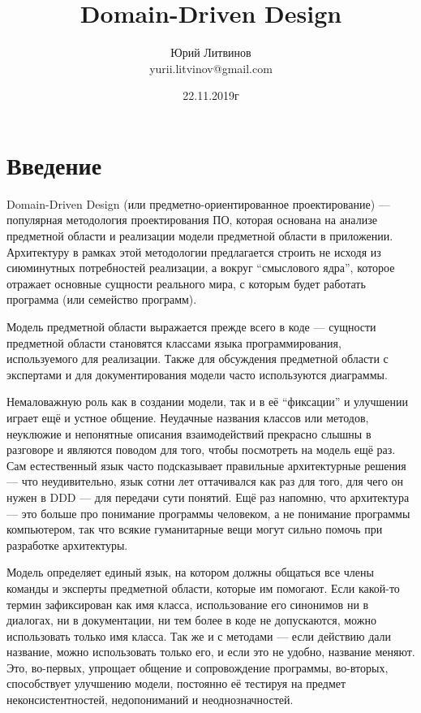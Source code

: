 \documentclass[a5paper]{article}
\title{Domain-Driven Design}
\author{Юрий Литвинов\\\small{yurii.litvinov@gmail.com}}
\date{22.11.2019г}
\begin{document}
\maketitle
\thispagestyle{empty}

\section{Введение}

 Domain-Driven Design (или предметно-ориентированное проектирование) --- популярная методология проектирования ПО, которая основана на анализе предметной области и реализации модели предметной области в приложении. Архитектуру в рамках этой методологии предлагается строить не исходя из сиюминутных потребностей реализации, а вокруг ``смыслового ядра'', которое отражает основные сущности реального мира, с которым будет работать программа (или семейство программ).

Модель предметной области выражается прежде всего в коде --- сущности предметной области становятся классами языка программирования, используемого для реализации. Также для обсуждения предметной области с экспертами и для документирования модели часто используются диаграммы.

Немаловажную роль как в создании модели, так и в её ``фиксации'' и улучшении играет ещё и устное общение. Неудачные названия классов или методов, неуклюжие и непонятные описания взаимодействий прекрасно слышны в разговоре и являются поводом для того, чтобы посмотреть на модель ещё раз. Сам естественный язык часто подсказывает правильные архитектурные решения --- что неудивительно, язык сотни лет оттачивался как раз для того, для чего он нужен в DDD --- для передачи сути понятий. Ещё раз напомню, что архитектура --- это больше про понимание программы человеком, а не понимание программы компьютером, так что всякие гуманитарные вещи могут сильно помочь при разработке архитектуры.

Модель определяет единый язык, на котором должны общаться все члены команды и эксперты предметной области, которые им помогают. Если какой-то термин зафиксирован как имя класса, использование его синонимов ни в диалогах, ни в документации, ни тем более в коде не допускаются, можно использовать только имя класса. Так же и с методами --- если действию дали название, можно использовать только его, и если это не удобно, название меняют. Это, во-первых, упрощает общение и сопровождение программы, во-вторых, способствует улучшению модели, постоянно её тестируя на предмет неконсистентностей, недопониманий и неоднозначностей.
\end{document}
